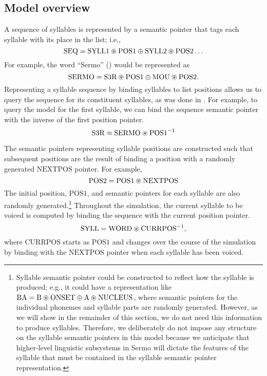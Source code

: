 \subsection{Model overview}
\label{sec:impl-prod-overview}

A sequence of syllables is represented
by a semantic pointer
that tags each syllable with its place
in the list; i.e.,
\begin{equation}
  \text{SEQ} = \text{SYLL1} \circledast \text{POS1} \oplus
    \text{SYLL2} \circledast \text{POS2} \ldots
\end{equation}
For example, the word ``Sermo''
()
would be represented as
\begin{equation}
  \text{SERMO} = \text{S3R} \circledast \text{POS1} \oplus
    \text{MOU} \circledast \text{POS2}.
\end{equation}
Representing a syllable sequence
by binding syllables to list positions
allows us to query the sequence
for its constituent syllables,
as was done in \cite{choo2010,eliasmith2012}.
For example, to query the model
for the first syllable,
we can bind the sequence semantic pointer
with the inverse of the first position pointer.
\begin{equation}
  \text{S3R} \approx \text{SERMO} \circledast \text{POS1}^{-1}
\end{equation}

The semantic pointers representing syllable positions
are constructed such that subsequent positions
are the result of binding a position with
a randomly generated $\text{NEXTPOS}$ pointer.
For example,
\begin{equation}
  \label{nextpos}
  \text{POS2} = \text{POS1} \circledast \text{NEXTPOS}
\end{equation}
The initial position, $\text{POS1}$,
and semantic pointers for each syllable
are also randomly generated.\footnote{
  Syllable semantic pointer could be constructed to
  reflect how the syllable is produced; e.g.,
  it could have a representation like
  $\text{BA} = \text{B} \circledast \text{ONSET} \oplus
    \text{A} \circledast \text{NUCLEUS}$,
  where semantic pointers for the individual phonemes
  and syllable parts are randomly generated.
  However,
  as we will show in the remainder of this section,
  we do not need this information to
  produce syllables.
  Therefore, we deliberately do not impose
  any structure on the syllable semantic pointers
  in this model because we anticipate
  that higher-level linguistic subsystems in Sermo
  will dictate the features of the syllable
  that must be contained
  in the syllable semantic pointer representation.}
Throughout the simulation,
the current syllable to be voiced
is computed by binding the sequence
with the current position pointer.
\begin{equation}
  \text{SYLL} = \text{WORD} \circledast \text{CURRPOS}^{-1},
\end{equation}
where $\text{CURRPOS}$ starts as $\text{POS1}$
and changes over the course of the simulation
by binding with the $\text{NEXTPOS}$ pointer
when each syllable has been voiced.

